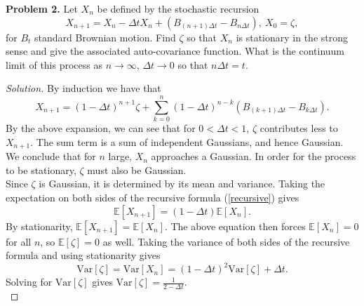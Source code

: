 \documentclass[11pt,letterpaper]{report}
\newcommand{\E}{\mathbb{E}}
\newcommand{\Var}{\text{Var}}
\newenvironment{solution}
{\begin{proof}[Solution]}
{\end{proof}}
\begin{document}
\noindent\textbf{Problem 2. }Let $X_n$ be defined by the stochastic recursion
\begin{equation}\label{recursive}
X_{n+1} = X_n - \Delta tX_n + (B_{(n+1)\Delta t} - B_{n\Delta t}),\ X_0 = \zeta,
\end{equation}
for $B_t$ standard Brownian motion. Find $\zeta$ so that $X_n$ is stationary in the strong sense and give the associated auto-covariance function. What is the continuum limit of this process as $n\to \infty$, $\Delta t\to 0$ so that $n\Delta t = t$.
\begin{solution}
	By induction we have that
	\begin{equation}\label{inductive}
	X_{n+1} = (1-\Delta t)^{n+1}\zeta + \sum_{k=0}^n(1-\Delta t)^{n-k}(B_{(k+1)\Delta t} - B_{k\Delta t}).
	\end{equation}
	By the above expansion, we can see that for $0<\Delta t< 1$, $\zeta$ contributes less to $X_{n+1}$. The sum term is a sum of independent Gaussians, and hence Gaussian. We conclude that for $n$ large, $X_n$ approaches a Gaussian. In order for the process to be stationary, $\zeta$ must also be Gaussian.\\

	\noindent Since $\zeta$ is Gaussian, it is determined by its mean and variance. Taking the expectation on both sides of the recursive formula (\ref{recursive}) gives
	\[
	\E[X_{n+1}] = (1-\Delta t)\E[X_n].
	\]
	By stationarity, $\E[X_{n+1}] = \E[X_n]$. The above equation then forces $\E[X_n] = 0$ for all $n$, so $\E[\zeta] = 0$ as well.
	Taking the variance of both sides of the recursive formula and using stationarity gives
	\[
	\Var[\zeta] = \Var[X_n] = (1-\Delta t)^2\Var[\zeta] + \Delta t.
	\]
	Solving for $\Var[\zeta]$ gives $\Var[\zeta] = \frac{1}{2-\Delta t}$.\\


\end{solution}
\end{document}
